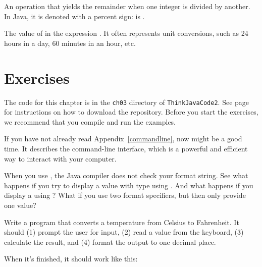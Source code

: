 {{\begin{description}

An operation that yields the remainder when one integer is divided by another.
In Java, it is denoted with a percent sign:  is .

The value of  in the expression .
It often represents unit conversions, such as 24 hours in a day, 60 minutes in an hour, etc.

\end{description}


\section{Exercises}

The code for this chapter is in the {\tt ch03} directory of {\tt ThinkJavaCode2}.
See page~\pageref{code} for instructions on how to download the repository.
Before you start the exercises, we recommend that you compile and run the examples.

If you have not already read Appendix~\ref{commandline}, now might be a good time.
It describes the command-line interface, which is a powerful and efficient way to interact with your computer.


\begin{exercise}  %

When you use , the Java compiler does not check your format string.
See what happens if you try to display a value with type  using .
And what happens if you display a  using ?
What if you use two format specifiers, but then only provide one value?

\end{exercise}



\begin{exercise}  %

Write a program that converts a temperature from Celsius to Fahrenheit.
It should (1) prompt the user for input, (2) read a  value from the keyboard, (3) calculate the result, and (4) format the output to one decimal place.

When it's finished, it should work like this:


\end{exercise}}}
